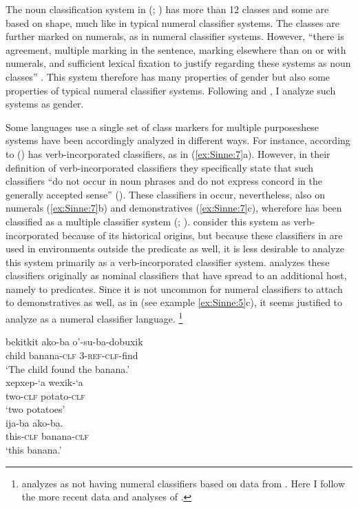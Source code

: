 \documentclass[output=collectionpaper]{langsci/langscibook}
\begin{document}
The noun classification system in  (; ) has more than 12 classes and some are based on shape, much like in typical numeral classifier systems. The classes are further marked on numerals, as in numeral classifier systems. However, ``there is agreement, multiple marking in the sentence, marking elsewhere than on or with numerals, and sufficient lexical fixation to justify regarding these systems as noun classes'' \citep[136]{Nichols1992}. This system therefore has many properties of gender but also some properties of typical numeral classifier systems. Following \citet{Nichols1992} and \citet{Corbett2013}, I analyze such systems as gender.

\largerpage
Some languages use a single set of class markers for multiple purposeshese systems have been accordingly analyzed in different ways. For instance, according to \citet[261]{Derbyshire1990}  () has verb\hyp{}incorporated classifiers, as in (\ref{ex:Sinne:7}a). However, in their definition of verb-incorporated classifiers they specifically state that such classifiers ``do not occur in noun phrases and do not express concord in the generally accepted sense'' (\citealt[245]{Derbyshire1990}). These classifiers in  occur, nevertheless, also on numerals (\ref{ex:Sinne:7}b) and demonstratives (\ref{ex:Sinne:7}c), wherefore  has been classified as a multiple classifier system (\citealt{Aikhenvald2000}; \citealt{Passer2016a}). \citet{Derbyshire1990} consider this system as verb-incorporated because of its historical origins, but because these classifiers in  are used in environments outside the predicate as well, it is less desirable to analyze this system primarily as a verb-incorporated classifier system. \citet{Passer2016a} analyzes these classifiers originally as nominal classifiers that have spread to an additional host, namely to predicates. Since it is not uncommon for numeral classifiers to attach to demonstratives as well, as in  (see example \ref{ex:Sinne:5}c), it seems justified to analyze  as a numeral classifier language.%
\footnote{\citet{Gil2013} analyzes  as not having numeral classifiers based on data from \citet{Derbyshire1990}. Here I follow the more recent data and analyses of \citet{Passer2016a}.}

\ea
\label{ex:Sinne:7}
\begin{xlist}
\ex
\gll bekitkit ako-ba o'-su-ba-dobuxik\\
child banana-\textsc{clf} \textsc{3-ref-clf}{}-find \\
\glt `The child found the banana.'\\
\ex
\gll xepxep-`a wexik-`a\\
two-\textsc{clf} potato-\textsc{clf} \\
\glt `two potatoes'\\
\ex
\gll ija-ba ako-ba.\\
this-\textsc{clf} banana-\textsc{clf}\\
\glt `this banana.'\\
\end{xlist}
\z
\end{document}
